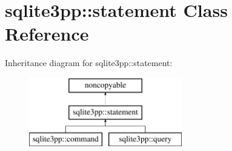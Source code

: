 \hypertarget{classsqlite3pp_1_1statement}{\section{sqlite3pp\-:\-:statement Class Reference}
\label{classsqlite3pp_1_1statement}
}
Inheritance diagram for sqlite3pp\-:\-:statement\-:\begin{figure}[H]
\begin{center}
\leavevmode
\includegraphics[height=3.000000cm]{classsqlite3pp_1_1statement}
\end{center}
\end{figure}
